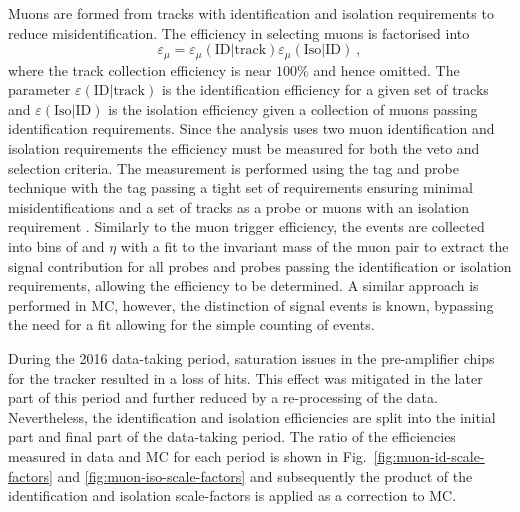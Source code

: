 Muons are formed from tracks with identification and isolation requirements to
reduce misidentification. The efficiency in selecting muons is factorised into
%
\begin{equation}
    \varepsilon_{\mu} = \varepsilon_{\mu}(\mathrm{ID}|\mathrm{track}) \varepsilon_{\mu}(\mathrm{Iso}|\mathrm{ID})\ ,
\end{equation}
%
where the track collection efficiency is near $100\%$ and hence omitted. The
parameter $\varepsilon(\mathrm{ID}|\mathrm{track})$ is the identification
efficiency for a given set of tracks and
$\varepsilon(\mathrm{Iso}|\mathrm{ID})$ is the isolation efficiency given a
collection of muons passing identification requirements. Since the analysis
uses two muon identification and isolation requirements the efficiency must be
measured for both the veto and selection criteria. The measurement is
performed using the tag and probe technique with the tag passing a tight set
of requirements ensuring minimal misidentifications and a set of tracks as a
probe or muons with an isolation requirement \cite{CMS-DP-2017-007}.
Similarly to the muon trigger efficiency, the events are collected into bins
of \pt and $\eta$ with a fit to the invariant mass of the muon pair to extract
the signal contribution for all probes and probes passing the identification
or isolation requirements, allowing the efficiency to be determined. A similar
approach is performed in MC, however, the distinction of signal events is
known, bypassing the need for a fit allowing for the simple counting of events.

During the 2016 data-taking period, saturation issues in the pre-amplifier
chips for the tracker resulted in a loss of hits. This effect was mitigated in
the later part of this period and further reduced by a re-processing of the
data. Nevertheless, the identification and isolation efficiencies are split
into the initial part and final part of the data-taking period. The ratio of
the efficiencies measured in data and MC for each period is shown in
Fig.~\ref{fig:muon-id-scale-factors} and \ref{fig:muon-iso-scale-factors} and
subsequently the product of the identification and isolation scale-factors is
applied as a correction to MC.


